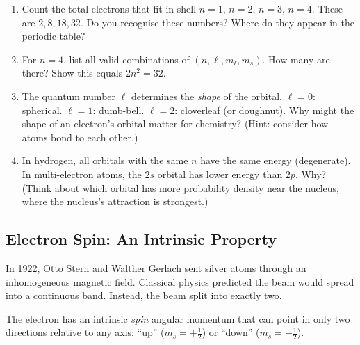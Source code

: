 \documentclass[12pt, a4paper]{book}
\newcommand{\newterm}[1]{\textit{\textcolor{DiscoveryColor}{#1}}}
\begin{document}
\begin{puzzlebox}
\begin{enumerate}[label=(\alph*), leftmargin=*]
  \item Count the total electrons that fit in shell $n=1$,
        $n=2$, $n=3$, $n=4$.
        These are $2, 8, 18, 32$.
        Do you recognise these numbers?
        Where do they appear in the periodic table?

  \item For $n=4$, list all valid combinations of
        $(n, \ell, m_\ell, m_s)$.
        How many are there?
        Show this equals $2n^2 = 32$.

  \item The quantum number $\ell$ determines the
        \emph{shape} of the orbital.
        $\ell = 0$: spherical. $\ell = 1$: dumb-bell.
        $\ell = 2$: cloverleaf (or doughnut).
        Why might the shape of an electron's orbital
        matter for chemistry?
        (Hint: consider how atoms bond to each other.)

  \item In hydrogen, all orbitals with the same $n$
        have the same energy (degenerate).
        In multi-electron atoms, the $2s$ orbital
        has lower energy than $2p$.
        Why? (Think about which orbital has more probability
        density near the nucleus, where the nucleus's
        attraction is strongest.)
\end{enumerate}
\end{puzzlebox}

\subsection{Electron Spin: An Intrinsic Property}

In 1922, Otto Stern and Walther Gerlach sent silver atoms
through an inhomogeneous magnetic field.
Classical physics predicted the beam would spread into
a continuous band.
Instead, the beam split into exactly two.

The electron has an intrinsic \newterm{spin} angular momentum
that can point in only two directions relative to any axis:
``up'' ($m_s = +\tfrac{1}{2}$) or ``down'' ($m_s = -\tfrac{1}{2}$).
\end{document}
